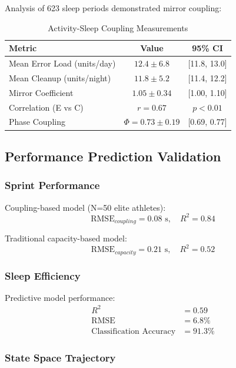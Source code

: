 \documentclass[12pt,twocolumn]{article}
\begin{document}
Analysis of 623 sleep periods demonstrated mirror coupling:

\begin{table}[H]
\centering
\caption{Activity-Sleep Coupling Measurements}
\begin{tabular}{lcc}
\toprule
Metric & Value & 95\% CI \\
\midrule
Mean Error Load (units/day) & $12.4 \pm 6.8$ & [11.8, 13.0] \\
Mean Cleanup (units/night) & $11.8 \pm 5.2$ & [11.4, 12.2] \\
Mirror Coefficient & $1.05 \pm 0.34$ & [1.00, 1.10] \\
Correlation (E vs C) & $r = 0.67$ & $p < 0.01$ \\
Phase Coupling & $\Phi = 0.73 \pm 0.19$ & [0.69, 0.77] \\
\bottomrule
\end{tabular}
\end{table}

\subsection{Performance Prediction Validation}

\subsubsection{Sprint Performance}

Coupling-based model (N=50 elite athletes):
\begin{equation}
\text{RMSE}_{coupling} = 0.08 \text{ s}, \quad R^2 = 0.84
\end{equation}

Traditional capacity-based model:
\begin{equation}
\text{RMSE}_{capacity} = 0.21 \text{ s}, \quad R^2 = 0.52
\end{equation}

\subsubsection{Sleep Efficiency}

Predictive model performance:
\begin{align}
R^2 &= 0.59 \\
\text{RMSE} &= 6.8\% \\
\text{Classification Accuracy} &= 91.3\%
\end{align}

\subsubsection{State Space Trajectory}
\end{document}
